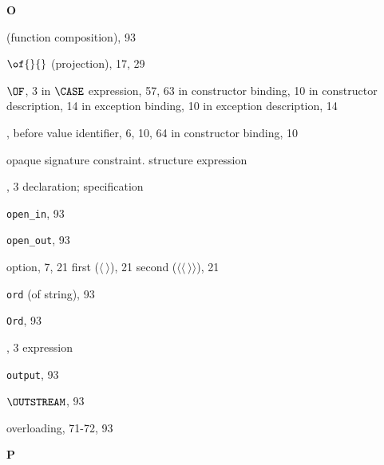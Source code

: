 \begin{theindex}
\parbox{65mm}{\hfil{\large\bf O}\hfil}

\indexspace

\item {} (function composition), 93
\item $\of{}{}$ (projection), 17, 29
\item $\OF$, 3
\subitem in $\CASE$ expression, 57, 63
\subitem in constructor binding, 10
\subitem in constructor description, 14
\subitem in exception binding, 10
\subitem in exception description, 14
\item \OP,
\subitem before value identifier, 6, 10, 64
\subitem in constructor binding, 10
\item opaque signature constraint. \see structure expression
\item \OPEN, 3
\subitem \seealso declaration; specification
\item \verb+open_in+, 93
\item \verb+open_out+, 93
\item option, 7, 21
\subitem first ($\langle\ \rangle$), 21
\subitem second ($\langle\langle\ \rangle\rangle$), 21
\item {\tt ord} (of string), 93
\item {\tt Ord}, 93
\item \ORELSE, 3
\subitem \seealso expression
\item {\tt output}, 93
\item $\OUTSTREAM$, 93
\item overloading, 71-72, 93
\indexspace

\parbox{65mm}{\hfil{\large\bf P}\hfil}

\indexspace


\end{theindex}
